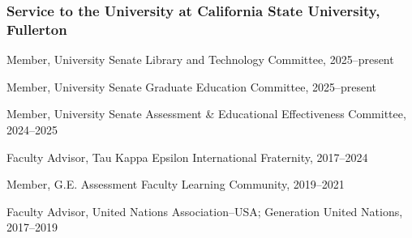 \documentclass[12pt,letterpaper]{article}
\renewenvironment{itemize}{
  \begin{list}{}{
    \setlength{\leftmargin}{1.5em}
    \setlength{\itemsep}{0.25em}
    \setlength{\parskip}{0pt}
    \setlength{\parsep}{0.25em}
  }
}{
  \end{list}
}
\begin{document}
\subsubsection*{Service to the University at California State University, Fullerton}
\begin{itemize}\leftmargin=2pt\itemindent=-15pt
    \item Member, University Senate Library and Technology Committee, 2025--present
    \item Member, University Senate Graduate Education Committee, 2025--present
    \item Member, University Senate Assessment \& Educational Effectiveness Committee, 2024--2025
    \item Faculty Advisor, Tau Kappa Epsilon International Fraternity, 2017--2024
    \item Member, G.E. Assessment Faculty Learning Community, 2019--2021
    \item Faculty Advisor, United Nations Association--USA; Generation United Nations, 2017--2019
\end{itemize}
\end{document}

